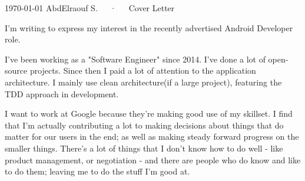 \documentclass[11pt, a4paper]{awesome-cv}
\begin{document}
\makecvheader[C]

\makecvfooter
  {\today}
  {AbdElraouf S.~~~·~~~Cover Letter}
  {}

\makelettertitle

\begin{cvletter}

I'm writing to express my interest in the recently advertised Android Developer role.


I've been working as a "Software Engineer" since 2014. I've done a lot of open-source projects. Since then I paid a lot of attention to the application architecture. I mainly use clean architecture(if a large project), featuring the TDD approach in development.


I want to work at Google because they're making good use of my skillset. I find that I'm actually contributing a lot to making decisions about things that do matter for our users in the end; as well as making steady forward progress on the smaller things. There's a lot of things that I don't know how to do well - like product management, or negotiation - and there are people who do know and like to do them; leaving me to do the stuff I'm good at.

\end{cvletter}


\makeletterclosing
\end{document}
